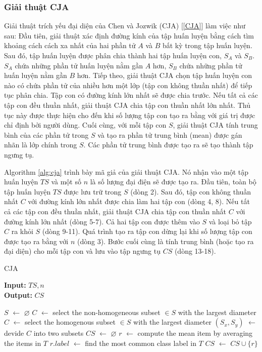 \documentclass[13pt,oneside]{scrbook}
\newcommand*\Let[2]{\State #1 $\gets$ #2}
\let\emptyset\varnothing
\begin{document}
\subsubsection{Giải thuật CJA}
Giải thuật trích yếu đại diện của Chen và Jozwik (CJA) [\ref{CJA}] làm việc như sau: Đầu tiên, giải thuật xác định đường kính của tập huấn luyện bằng cách tìm khoảng cách cách xa nhất của hai phần tử $A$ và $B$ bất kỳ trong tập huấn luyện.
Sau đó, tập huấn luyện được phân chia thành hai tập huấn luyện con, $S_A$ và $S_B$.
$S_A$ chứa những phần tử huấn luyện nằm gần $A$ hơn, $S_B$ chứa những phần tử huấn luyện nằm gần $B$ hơn.
Tiếp theo, giải thuật CJA chọn tập huấn luyện con nào có chứa phần tử của nhiều hơn một lớp (tập con không thuần nhất) để tiếp tục phân chia.
Tập con có đường kính lớn nhất sẽ được chia trước.
Nếu tất cả các tập con đều thuần nhất, giải thuật CJA chia tập con thuần nhất lớn nhất.
Thủ tục này được thực hiện cho đến khi số lượng tập con tạo ra bằng với giá trị được chỉ định bởi người dùng.
Cuối cùng, với mỗi tập con $S$, giải thuật CJA tính trung bình của các phần tử trong $S$ và tạo ra phần tử trung bình (mean) được gán nhãn là lớp chính trong $S$.
Các phần tử trung bình được tạo ra sẽ tạo thành tập ngưng tụ.

Algorithm \ref{alg:cja} trình bày mã giả của giải thuật CJA.
Nó nhận vào một tập huấn luyện $TS$ và một số $n$ là số lượng đại điện sẽ được tạo ra.
Đầu tiên, toàn bộ tập huấn luyện $TS$ được lưu trữ trong $S$ (dòng 2).
Sau đó, tập con không thuần nhất $C$ với đường kính lớn nhất được chia làm hai tập con (dòng 4, 8).
Nếu tất cả các tập con đều thuần nhất, giải thuật CJA chia tập con thuần nhất $C$ với đường kính lớn nhất (dòng 5-7).
Cả hai tập con được thêm vào $S$ và loại bỏ tập $C$ ra khỏi $S$ (dòng 9-11).
Quá trình tạo ra tập con dừng lại khi số lượng tập con được tạo ra bằng với $n$ (dòng 3).
Bước cuối cùng là tính trung bình (hoặc tạo ra đại diện) cho mỗi tập con và lưu vào tập ngưng tụ $CS$ (dòng 13-18).
\begin{algorithm}[h!]
  \caption{CJA
   \label{alg:cja}}
    \textbf{Input:} $TS,n$\\
    \textbf{Output:} $CS$
  \begin{algorithmic}[1]
      \Let{$S$}{$\emptyset$}
        \Let{$C$}{select the non-homogeneous subset $\in S$ with the largest diameter}
        \If{$C==\emptyset$ \{All subsets are homogeneous\}}
          \Let{$C$}{select the homogenous subset $\in S$ with the largest diameter}
        \EndIf
        \Let{$(S_x,S_y)$} {devide $C$ into two subsets}
      \EndFor
      \Let{$CS$}{$\emptyset$}
        \Let{$r$}{compute the mean item by averaging the items in $T$}
        \Let{$r.label$} {find the most common class label in $T$}
        \Let{$CS$}{$CS \cup \{r\}$}
      \EndFor
       \State {}
  \end{algorithmic}
\end{algorithm}
\end{document}
